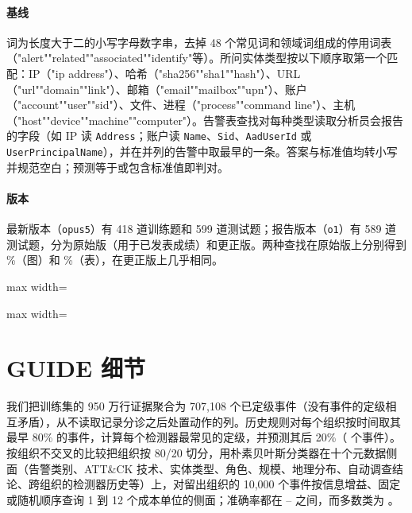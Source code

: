 \paragraph{基线} 词为长度大于二的小写字母数字串，去掉 48 个常见词和领域词组成的停用词表（"alert""related""associated""identify"等）。所问实体类型按以下顺序取第一个匹配：IP（"ip address"）、哈希（"sha256""sha1""hash"）、URL（"url""domain""link"）、邮箱（"email""mailbox""upn"）、账户（"account""user""sid"）、文件、进程（"process""command line"）、主机（"host""device""machine""computer"）。告警表查找对每种类型读取分析员会报告的字段（如 IP 读 \texttt{Address}；账户读 \texttt{Name}、\texttt{Sid}、\texttt{AadUserId} 或 \texttt{UserPrincipalName}），并在并列的告警中取最早的一条。答案与标准值均转小写并规范空白；预测等于或包含标准值即判对。

\paragraph{版本} 最新版本（\texttt{opus5}）有 418 道训练题和 599 道测试题；报告版本（\texttt{o1}）有 589 道测试题，分为原始版（用于已发表成绩）和更正版。两种查找在原始版上分别得到 \oGraph\%（图）和 \oTable\%（表），在更正版上几乎相同。

\begin{table}[h]
  \caption{报告版本：各事件的题数、点名与查找比例（\%），以及三个模型的报告平均奖励（\%）~\citep{excytin}。}
  \label{tab:incidents}
  \centering\footnotesize
  \begin{adjustbox}{max width=\columnwidth}\end{adjustbox}
\end{table}

\begin{table}[h]
  \caption{报告版本：每个模型在八个事件上报告奖励与点名题比例之间的 Spearman 相关，以及报告平均奖励（\%）。}
  \label{tab:h3}
  \centering\scriptsize
  \begin{adjustbox}{max width=\columnwidth}\end{adjustbox}
\end{table}

\section{GUIDE 细节}
\label{app:guide}

我们把训练集的 950 万行证据聚合为 707{,}108 个已定级事件（没有事件的定级相互矛盾），从不读取记录分诊之后处置动作的列。历史规则对每个组织按时间取其最早 80\% 的事件，计算每个检测器最常见的定级，并预测其后 20\%（\gDev{} 个事件）。按组织不交叉的比较把组织按 80/20 切分，用朴素贝叶斯分类器在十个元数据侧面（告警类别、ATT\&CK 技术、实体类型、角色、规模、地理分布、自动调查结论、跨组织的检测器历史等）上，对留出组织的 10{,}000 个事件按信息增益、固定或随机顺序查询 1 到 12 个成本单位的侧面；准确率都在 \gHeldMin--\gHeldMax{} 之间，而多数类为 \gHeldMajority。

